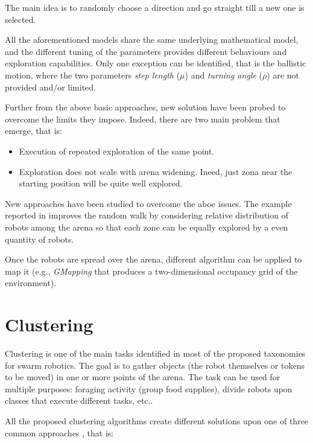 The main idea is to randomly choose a direction and go straight till a new one is selected.

\noindent
All the aforementioned models share the same underlying mathematical model, and the different tuning of the parameters provides different behaviours and exploration capabilities. Only one exception can be identified, that is the ballistic motion, where the two parameters \textit{step length} ($\mu$) and \textit{turning angle} ($\rho$) are not provided and/or limited. 

\bigskip
Further from the above basic approaches, new solution have been probed to overcome the limits they impose. Indeed, there are two main problem that emerge, that is:

\begin{itemize}

  \item Execution of repeated exploration of the same point.
  \item Exploration does not scale with arena widening. Ineed, just zona near the starting position will be quite well explored.
 
\end{itemize}

New approaches have been studied to overcome the aboe issues. The example reported in \cite{rw-improved} improves the random walk by considering relative distribution of robots among the arena so that each zone can be equally explored by a even quantity of robots.  

\bigskip
Once the robots are spread over the arena, different algorithm can be applied to map it (e.g., \textit{GMapping} that produces a two-dimensional occupancy grid of the environment). 

\section{Clustering}

Clustering is one of the main tasks identified in most of the proposed taxonomies for swarm robotics. The goal is to gather objects (the robot themselves or tokens to be moved) in one or more points of the arena. The task can be used for multiple purposes: foraging activity (group food supplies), divide robots upon classes that execute different tasks, etc..

\noindent
All the proposed clustering algorithms create different solutions upon one of three common approaches \cite{clustering-summary}, that is:

